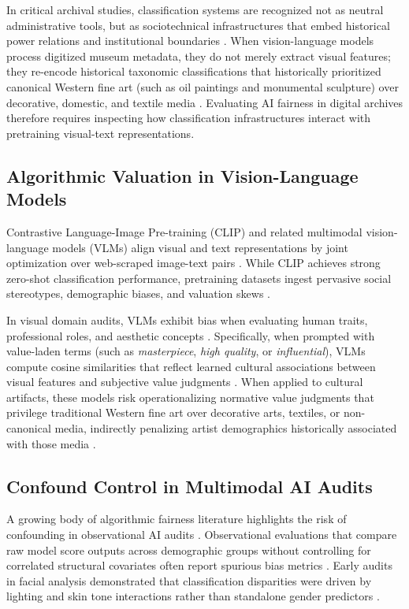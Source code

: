 \documentclass[pdflatex,sn-mathphys-num]{sn-jnl}%
\theoremstyle{thmstyleone}%
\theoremstyle{thmstyletwo}%
\theoremstyle{thmstylethree}%
\begin{document}
In critical archival studies, classification systems are recognized not as neutral administrative tools, but as sociotechnical infrastructures that embed historical power relations and institutional boundaries \cite{bowker2000sorting}. When vision-language models process digitized museum metadata, they do not merely extract visual features; they re-encode historical taxonomic classifications that historically prioritized canonical Western fine art (such as oil paintings and monumental sculpture) over decorative, domestic, and textile media \cite{bailey2020gender, bowker2000sorting}. Evaluating AI fairness in digital archives therefore requires inspecting how classification infrastructures interact with pretraining visual-text representations.

\subsection{Algorithmic Valuation in Vision-Language Models}
Contrastive Language-Image Pre-training (CLIP) \cite{radford2021learning} and related multimodal vision-language models (VLMs) align visual and text representations by joint optimization over web-scraped image-text pairs \cite{he2016deep, dosovitskiy2020image}. While CLIP achieves strong zero-shot classification performance, pretraining datasets ingest pervasive social stereotypes, demographic biases, and valuation skews \cite{birhane2021multimodal, wolfe2022evidence, bender2021stochastic, steed2021image}.

In visual domain audits, VLMs exhibit bias when evaluating human traits, professional roles, and aesthetic concepts \cite{hall2023auditing, wang2022revisiting, luccioni2023stable}. Specifically, when prompted with value-laden terms (such as \textit{masterpiece}, \textit{high quality}, or \textit{influential}), VLMs compute cosine similarities that reflect learned cultural associations between visual features and subjective value judgments \cite{garcia2020bias, bianchi2023easily}. When applied to cultural artifacts, these models risk operationalizing normative value judgments that privilege traditional Western fine art over decorative arts, textiles, or non-canonical media, indirectly penalizing artist demographics historically associated with those media \cite{wolfe2022evidence, zhao2017men}.

\subsection{Confound Control in Multimodal AI Audits}
A growing body of algorithmic fairness literature highlights the risk of confounding in observational AI audits \cite{buolamwini2018gender, mitchell2019model, bolukbasi2016man}. Observational evaluations that compare raw model score outputs across demographic groups without controlling for correlated structural covariates often report spurious bias metrics \cite{hall2023auditing}. Early audits in facial analysis demonstrated that classification disparities were driven by lighting and skin tone interactions rather than standalone gender predictors \cite{buolamwini2018gender}.
\end{document}
